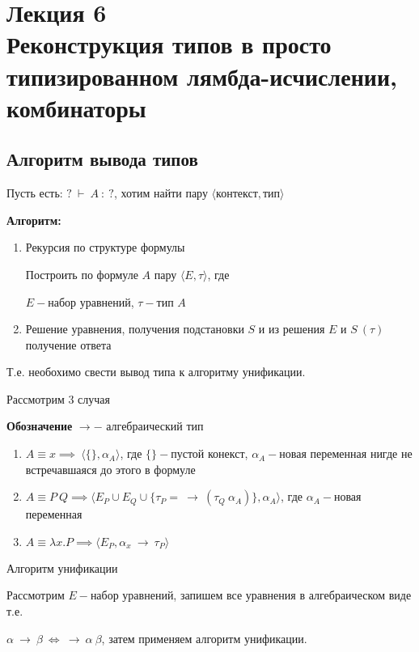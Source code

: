 \section{Лекция 6 \\ Реконструкция типов в просто типизированном лямбда-исчислении, комбинаторы}
		\subsection{Алгоритм вывода типов}
					
			Пусть есть: $?\:\vdash \:A\: :\: ?$, хотим найти пару $\big \langle \text{контекст}, \text{тип} \big \rangle$\par
	\textbf{Алгоритм:}
	\begin{enumerate}
		\item Рекурсия по структуре формулы\par Построить по формуле $A$ пару $\big \langle E, \tau\big \rangle$, где\par $E-$набор уравнений, $\tau-$тип $A$
		\item Решение уравнения, получения подстановки $S$ и из решения $E$ и $S\:(\tau)$ получение ответа	
	\end{enumerate}
		Т.е. необохимо свести вывод типа к алгоритму унификации.\par
		\begin{oun_paragraph}Рассмотрим 3 случая\end{oun_paragraph}
			\textbf{Обозначение } $\rightarrow-$ алгебраический тип 
			\begin{enumerate}
				\item $A\equiv x\implies\:\big \langle \{\}, \alpha_A\big\rangle$, где $\{\}-$пустой конекст, $\alpha_A-$новая переменная нигде не встречавшаяся до этого в формуле
				\item $A\equiv P\:Q\implies\big \langle E_P\cup E_Q\cup \{\tau_P=\:\rightarrow\:(\tau_Q\:\alpha_A)\}, \alpha_A\big \rangle$, где $\alpha_A-$новая переменная
				\item $A\equiv\lambda x.P\implies\big\langle E_P,\alpha_x\:\rightarrow\:\tau_P\big\rangle$
			\end{enumerate}
		\begin{oun_paragraph}Алгоритм унификации\end{oun_paragraph} 
			Рассмотрим $E-$набор уравнений, запишем все уравнения в алгебраическом виде т.е. \par $\alpha\:\rightarrow\:\beta\:\Leftrightarrow\:\rightarrow\:\alpha\:\beta$, затем применяем алгоритм унификации.
